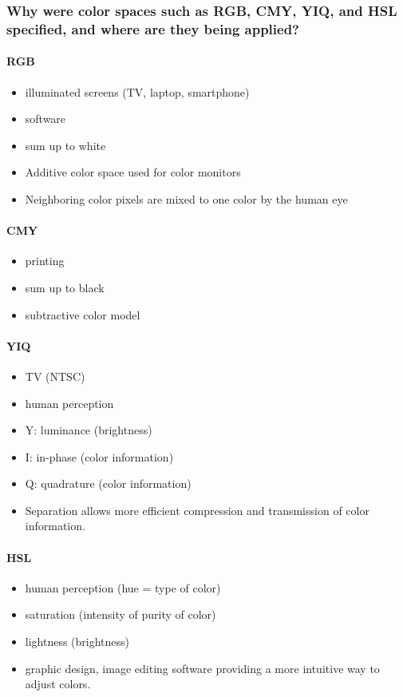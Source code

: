 \documentclass{article}
\begin{document}
\subsubsection*{Why were color spaces such as RGB, CMY, YIQ, and HSL specified, and
    where are they being applied?}
\paragraph*{RGB}
\begin{itemize}
    \item illuminated screens (TV, laptop, smartphone)
    \item software
    \item sum up to white
    \item Additive color space used for color monitors
    \item Neighboring color pixels are mixed to one color by the human eye
\end{itemize}

\paragraph*{CMY}
\begin{itemize}
    \item printing
    \item sum up to black
    \item subtractive color model
\end{itemize}

\paragraph*{YIQ}
\begin{itemize}
    \item TV (NTSC)
    \item human perception
    \item Y: luminance (brightness)
    \item I: in-phase (color information)
    \item Q: quadrature (color information)
    \item Separation allows more efficient compression and transmission of color information.
\end{itemize}

\paragraph*{HSL}
\begin{itemize}
    \item human perception (hue = type of color)
    \item saturation (intensity of purity of color)
    \item lightness (brightness)
    \item graphic design, image editing software providing a more intuitive way to adjust colors.
\end{itemize}
\end{document}

